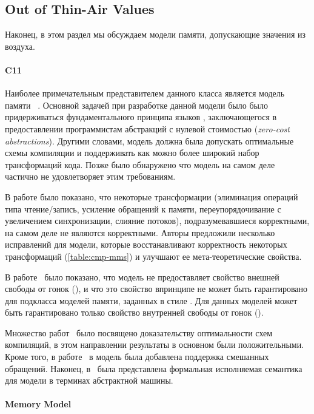 \subsection{Out of Thin-Air Values}

Наконец, в этом раздел мы обсуждаем модели памяти, 
допускающие значения из воздуха. 

\paragraph{C11}

Наиболее примечательным представителем данного класса 
является модель памяти \CMM~\cite{Batty-al:POPL11}.
Основной задачей при разработке данной модели было 
было придерживаться фундаментального принципа языков \CPP, 
заключающегося в предоставлении программистам 
абстракций с нулевой стоимостью (\emph{zero-cost abstractions}).
Другими словами, модель \CMM должна была допускать
оптимальные схемы компиляции и поддерживать
как можно более широкий набор трансформаций кода. 
Позже было обнаружено что модель на самом деле 
частично не удовлетворяет этим требованиям. 


В работе \cite{Vafeiadis-al:POPL15} было показано, что некоторые трансформации 
(элиминация операций типа чтение/запись, усиление обращений к памяти,
переупорядочивание с увеличением синхронизации, слияние потоков), 
подразумевавшиеся корректными, на самом деле не являются корректными.
Авторы предложили несколько исправлений для модели, 
которые восстанавливают корректность некоторых трансформаций (\see \cref{table:cmp-mms})
и улучшают ее мета-теоретические свойства. 

В работе~\cite{Batty-al:ESOP15} было показано, 
что модель не предоставляет свойство внешней свободы от гонок (\eDRF), 
и что это свойство впринципе не может быть гарантировано 
для подкласса моделей памяти, заданных в стиле \CMM.
Для данных моделей может быть гарантировано 
только свойство внутренней свободы от гонок (\iDRF).

Множество работ~\cite{Batty-al:POPL11, Sarkar-al:PLDI12, Batty-al:POPL12, Batty-al:POPL16} 
было посвящено доказательству оптимальности схем компиляций, 
в этом направлении результаты в основном были положительными. 
Кроме того, в работе~\cite{Flur-al:POPL17} в модель была 
добавлена поддержка смешанных обращений. 
Наконец, в~\cite{Nienhuis-al:OOPSLA16} была представлена 
формальная исполняемая семантика для модели \CMM в терминах абстрактной машины.  

\paragraph{\JS Memory Model}

